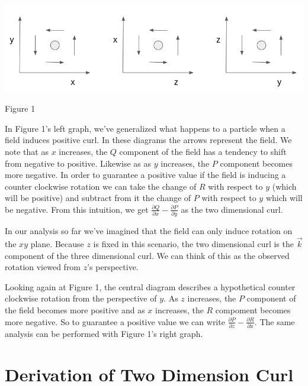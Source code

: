 \documentclass{article}
\begin{document}
				\includegraphics[width=15cm]{curl.png}
					\begin{center}
					Figure 1
				\end{center}
				
			\par \noindent In Figure 1's left graph, we've generalized what happens to a particle when a field induces positive curl. In these diagrams the arrows represent the field. We note that as \(x\) increases, the \(Q\) component of the field has a tendency to shift from negative to positive. Likewise as as \(y\) increases, the \(P\) component becomes more negative. In order to guarantee a positive value if the field is inducing a counter clockwise rotation we can  take the change of \(R\) with respect to \(y\) (which will be positive) and subtract from it the change of \(P\) with respect to \(y\) which will be negative. From this intuition, we get \(\frac{\partial Q}{\partial x} - \frac{\partial P}{\partial y}\) as the two dimensional curl.
			\newline
			\par\noindent In our analysis so far we've imagined that the field can only induce rotation on the \(xy\) plane. Because \(z\) is fixed in this scenario, the two dimensional curl is the \(\vec k\) component of the three dimensional curl. We can think of this as the observed rotation viewed from \(z\)'s perspective.
			\newline
			\par\noindent Looking again at Figure 1, the central diagram describes a hypothetical counter clockwise rotation from the perspective of \(y\). As \(z\) increases, the \(P\) component of the field becomes more positive and as \(x\) increases, the \(R\) compoment becomes more negative. So to guarantee a positive value we can write \(\frac{\partial P}{\partial z} - \frac{\partial R}{\partial x}\). The same analysis can be performed with Figure 1's right graph.
			

\section{Derivation of Two Dimension Curl}
\end{document}
